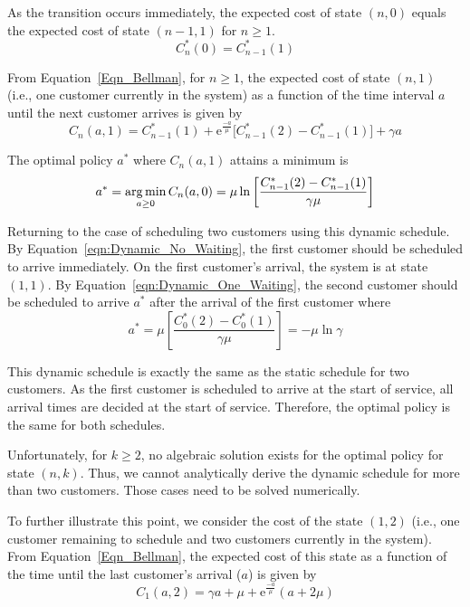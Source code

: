 As the transition occurs immediately, the expected cost of state $(n, 0)$ equals the expected cost of state $(n - 1, 1)$ for $n \geq 1$.
\begin{equation}
	C_{n}^{*} (0) = C_{n - 1}^{*} (1)
\end{equation}

From Equation~\ref{Eqn_Bellman}, for $n \geq 1$, the expected cost of state $(n, 1)$ (i.e., one customer currently in the system) as a function of the time interval $a$ until the next customer arrives is given by
\begin{equation}
	C_{n} (a, 1) = C_{n - 1}^{*} (1) + \mathrm{e}^{\frac{-a}{\mu}} \Big[ C_{n - 1}^{*} (2) - C_{n - 1}^{*} (1) \Big] + \gamma a
\end{equation}

The optimal policy $a^{*}$ where $C_{n} (a, 1)$ attains a minimum is
\begin{equation}
	a^{*} = \operatorname*{arg\,min}_{a \geq 0} C_{n} (a, 0) = \mu \ln \left[ \frac{C_{n - 1}^{*} (2) - C_{n - 1}^{*} (1)}{\gamma \mu} \right]
	\label{eqn:Dynamic_One_Waiting}
\end{equation}

Returning to the case of scheduling two customers using this dynamic schedule. By Equation~\ref{eqn:Dynamic_No_Waiting}, the first customer should be scheduled to arrive immediately. On the first customer's arrival, the system is at state $(1, 1)$. By Equation~\ref{eqn:Dynamic_One_Waiting}, the second customer should be scheduled to arrive $a^{*}$ after the arrival of the first customer where
\begin{equation}
	a^{*} = \mu \left[ \frac{C_{0}^{*} (2) - C_{0}^{*} (1)}{\gamma \mu} \right] = - \mu \ln \gamma
\end{equation}

This dynamic schedule is exactly the same as the static schedule for two customers. As the first customer is scheduled to arrive at the start of service, all arrival times are decided at the start of service. Therefore, the optimal policy is the same for both schedules.

Unfortunately, for $k \geq 2$, no algebraic solution exists for the optimal policy for state $(n, k)$. Thus, we cannot analytically derive the dynamic schedule for more than two customers. Those cases need to be solved numerically.

To further illustrate this point, we consider the cost of the state $(1, 2)$ (i.e., one customer remaining to schedule and two customers currently in the system). From Equation~\ref{Eqn_Bellman}, the expected cost of this state as a function of the time until the last customer's arrival ($a$) is given by
\begin{equation}
	C_{1} (a, 2) = \gamma a + \mu + \mathrm{e}^{\frac{-a}{\mu}} (a + 2 \mu)
\end{equation}

